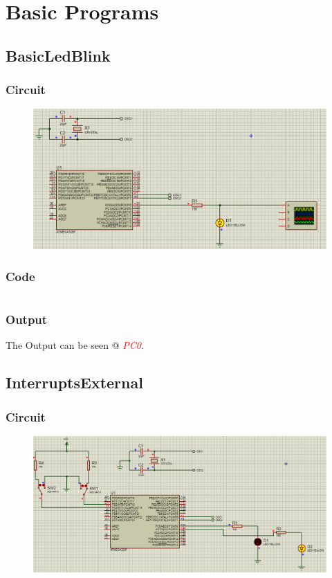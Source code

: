 \documentclass[oneside]{book}
\newcommand{\pinFormat}[1]{\emph{\textcolor{red}{#1}}}
\begin{document}
\tableofcontents

\chapter{Basic Programs}

\section{BasicLedBlink}
\subsection{Circuit}
\begin{figure}[H]
    \centering
    \includegraphics[height=0.2\textheight]{basicLedBlink.png}
\end{figure}
\subsection{Code}
\inputminted[bgcolor=black]{c}{../programFiles/basicLedBlink.c}
\subsection{Output}
\quad The Output can be seen @ \pinFormat{PC0}.


\section{InterruptsExternal}
\subsection{Circuit}
\begin{figure}[H]
    \centering
    \includegraphics[height=0.2\textheight]{InterruptsExternal.png}
\end{figure}
\end{document}
